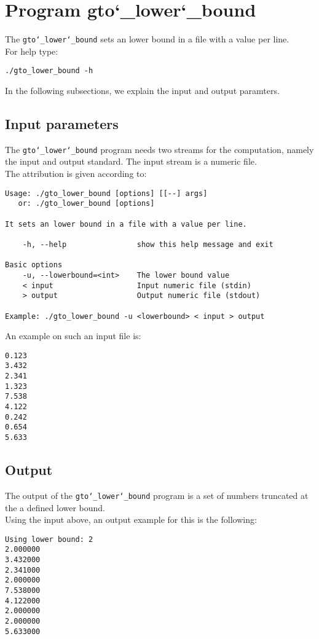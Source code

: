 \section{Program gto\char`_lower\char`_bound}
The \texttt{gto\char`_lower\char`_bound} sets an lower bound in a file with a value per line.\\
For help type:
\begin{lstlisting}
./gto_lower_bound -h
\end{lstlisting}
In the following subsections, we explain the input and output paramters.

\subsection*{Input parameters}

The \texttt{gto\char`_lower\char`_bound} program needs two streams for the computation,
namely the input and output standard. The input stream is a numeric file.\\
The attribution is given according to:
\begin{lstlisting}
Usage: ./gto_lower_bound [options] [[--] args]
   or: ./gto_lower_bound [options]

It sets an lower bound in a file with a value per line.

    -h, --help                show this help message and exit

Basic options
    -u, --lowerbound=<int>    The lower bound value
    < input                   Input numeric file (stdin)
    > output                  Output numeric file (stdout)

Example: ./gto_lower_bound -u <lowerbound> < input > output
\end{lstlisting}
An example on such an input file is:
\begin{lstlisting}
0.123
3.432
2.341
1.323
7.538
4.122
0.242
0.654
5.633
\end{lstlisting}

\subsection*{Output}
The output of the \texttt{gto\char`_lower\char`_bound} program is a set of numbers truncated at the a defined lower bound.\\
Using the input above, an output example for this is the following:
\begin{lstlisting}
Using lower bound: 2
2.000000
3.432000
2.341000
2.000000
7.538000
4.122000
2.000000
2.000000
5.633000
\end{lstlisting}
